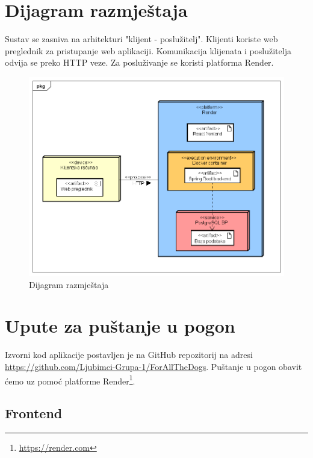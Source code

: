 			\eject 
		
		
		\section{Dijagram razmještaja}
			
			Sustav se zasniva na arhitekturi "klijent - poslužitelj". Klijenti koriste web preglednik za pristupanje web aplikaciji. Komunikacija klijenata i poslužitelja odvija se preko HTTP veze. Za posluživanje se koristi platforma Render.
			 
			 \begin{figure}[H]
				\includegraphics[scale=0.6]{slike/dijagram_razmjestaja.PNG} 
				\centering
				\caption{Dijagram razmještaja}
				\label{dijagram_razmjestaja}
			\end{figure}
			
			\eject 
		
		\section{Upute za puštanje u pogon}
		
			Izvorni kod aplikacije postavljen je na GitHub repozitorij na adresi \url{https://github.com/Ljubimci-Grupa-1/ForAllTheDogs}. Puštanje u pogon obavit ćemo uz pomoć platforme Render\footnote{\url{https://render.com}}.
			
			\subsection{Frontend}
			
